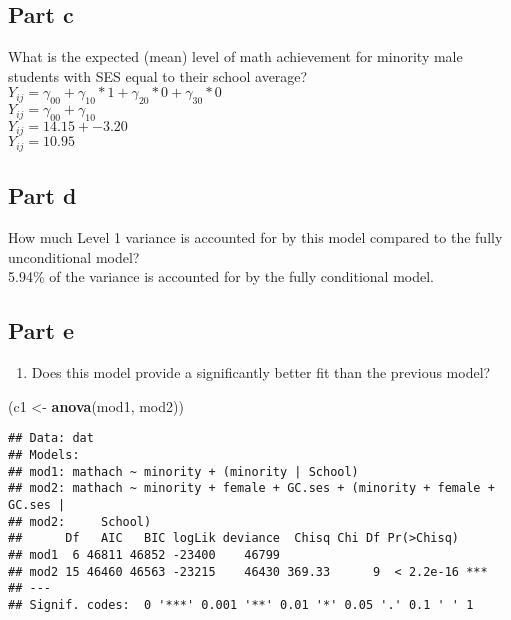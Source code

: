 \documentclass[]{article}
\newenvironment{Shaded}{\begin{snugshade}}{\end{snugshade}}
\newcommand{\KeywordTok}[1]{\textcolor[rgb]{0.13,0.29,0.53}{\textbf{#1}}}
\newcommand{\StringTok}[1]{\textcolor[rgb]{0.31,0.60,0.02}{#1}}
\newcommand{\NormalTok}[1]{#1}
\providecommand{\tightlist}{%
  \setlength{\itemsep}{0pt}\setlength{\parskip}{0pt}}
\begin{document}
\subsection{Part c}\label{part-c-1}

What is the expected (mean) level of math achievement for minority male
students with SES equal to their school average?\\
\(Y_{ij} = \gamma_{00} + \gamma_{10}*1 + \gamma_{20}*0 + \gamma_{30}*0\)\\
\(Y_{ij} = \gamma_{00} + \gamma_{10}\)\\
\(Y_{ij} = 14.15 + -3.20\)\\
\(Y_{ij} = 10.95\)

\subsection{Part d}\label{part-d-1}

How much Level 1 variance is accounted for by this model compared to the
fully unconditional model?\\
5.94\% of the variance is accounted for by the fully conditional model.

\subsection{Part e}\label{part-e}

\begin{enumerate}
\def\labelenumi{(\alph{enumi})}
\setcounter{enumi}{4}
\tightlist
\item
  Does this model provide a significantly better fit than the previous
  model?
\end{enumerate}

\begin{Shaded}
\begin{Highlighting}[]
\NormalTok{(c1 <-}\StringTok{ }\KeywordTok{anova}\NormalTok{(mod1, mod2)) }
\end{Highlighting}
\end{Shaded}

\begin{verbatim}
## Data: dat
## Models:
## mod1: mathach ~ minority + (minority | School)
## mod2: mathach ~ minority + female + GC.ses + (minority + female + GC.ses | 
## mod2:     School)
##      Df   AIC   BIC logLik deviance  Chisq Chi Df Pr(>Chisq)    
## mod1  6 46811 46852 -23400    46799                             
## mod2 15 46460 46563 -23215    46430 369.33      9  < 2.2e-16 ***
## ---
## Signif. codes:  0 '***' 0.001 '**' 0.01 '*' 0.05 '.' 0.1 ' ' 1
\end{verbatim}
\end{document}
